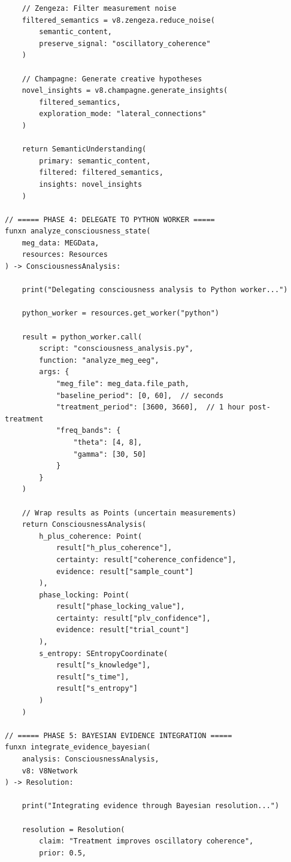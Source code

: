 \begin{verbatim}
    // Zengeza: Filter measurement noise
    filtered_semantics = v8.zengeza.reduce_noise(
        semantic_content,
        preserve_signal: "oscillatory_coherence"
    )
    
    // Champagne: Generate creative hypotheses
    novel_insights = v8.champagne.generate_insights(
        filtered_semantics,
        exploration_mode: "lateral_connections"
    )
    
    return SemanticUnderstanding(
        primary: semantic_content,
        filtered: filtered_semantics,
        insights: novel_insights
    )

// ===== PHASE 4: DELEGATE TO PYTHON WORKER =====
funxn analyze_consciousness_state(
    meg_data: MEGData,
    resources: Resources
) -> ConsciousnessAnalysis:
    
    print("Delegating consciousness analysis to Python worker...")
    
    python_worker = resources.get_worker("python")
    
    result = python_worker.call(
        script: "consciousness_analysis.py",
        function: "analyze_meg_eeg",
        args: {
            "meg_file": meg_data.file_path,
            "baseline_period": [0, 60],  // seconds
            "treatment_period": [3600, 3660],  // 1 hour post-treatment
            "freq_bands": {
                "theta": [4, 8],
                "gamma": [30, 50]
            }
        }
    )
    
    // Wrap results as Points (uncertain measurements)
    return ConsciousnessAnalysis(
        h_plus_coherence: Point(
            result["h_plus_coherence"],
            certainty: result["coherence_confidence"],
            evidence: result["sample_count"]
        ),
        phase_locking: Point(
            result["phase_locking_value"],
            certainty: result["plv_confidence"],
            evidence: result["trial_count"]
        ),
        s_entropy: SEntropyCoordinate(
            result["s_knowledge"],
            result["s_time"],
            result["s_entropy"]
        )
    )

// ===== PHASE 5: BAYESIAN EVIDENCE INTEGRATION =====
funxn integrate_evidence_bayesian(
    analysis: ConsciousnessAnalysis,
    v8: V8Network
) -> Resolution:
    
    print("Integrating evidence through Bayesian resolution...")
    
    resolution = Resolution(
        claim: "Treatment improves oscillatory coherence",
        prior: 0.5,
        

\end{verbatim}
